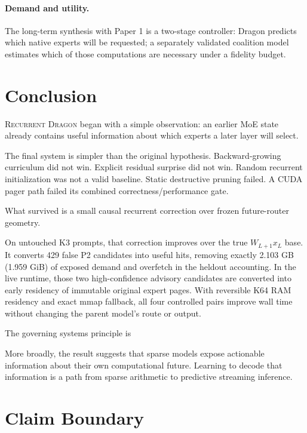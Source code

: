 \documentclass[11pt]{article}
\newcommand{\Dragon}{\textsc{Recurrent Dragon}\xspace}
\begin{document}
\paragraph{Demand and utility.}
The long-term synthesis with Paper 1 is a two-stage controller: Dragon predicts which native experts will be requested; a separately validated coalition model estimates which of those computations are necessary under a fidelity budget.

\section{Conclusion}

\Dragon began with a simple observation: an earlier MoE state already contains useful information about which experts a later layer will select.

The final system is simpler than the original hypothesis. Backward-growing curriculum did not win. Explicit residual surprise did not win. Random recurrent initialization was not a valid baseline. Static destructive pruning failed. A CUDA pager path failed its combined correctness/performance gate.

What survived is a small causal recurrent correction over frozen future-router geometry.

On untouched K3 prompts, that correction improves over the true $W_{L+1}x_L$ base. It converts 429 false P2 candidates into useful hits, removing exactly 2.103 GB (1.959 GiB) of exposed demand and overfetch in the heldout accounting. In the live runtime, those two high-confidence advisory candidates are converted into early residency of immutable original expert pages. With reversible K64 RAM residency and exact mmap fallback, all four controlled pairs improve wall time without changing the parent model's route or output.

The governing systems principle is
\begin{center}
\end{center}
More broadly, the result suggests that sparse models expose actionable information about their own computational future. Learning to decode that information is a path from sparse arithmetic to predictive streaming inference.

\appendix
\section{Claim Boundary}
\end{document}

